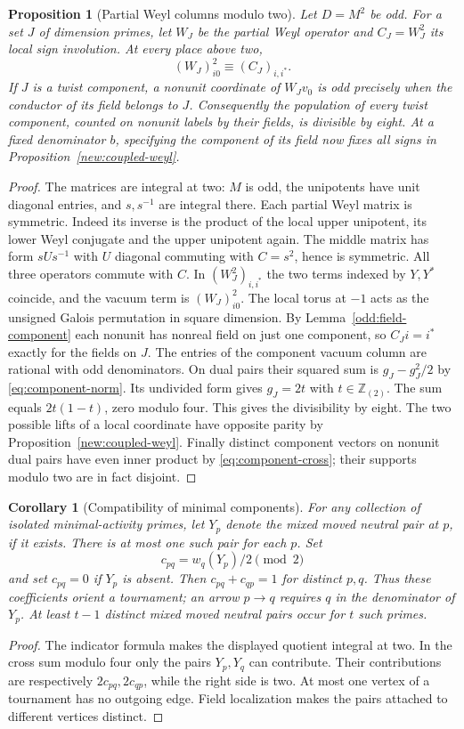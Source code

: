 \documentclass[11pt]{amsart}
\numberwithin{equation}{section}
\newtheorem{proposition}[theorem]{Proposition}
\newtheorem{corollary}[theorem]{Corollary}
\theoremstyle{definition}
\theoremstyle{plain}
\newcommand{\ZZ}{\mathbb Z}
\begin{document}
\begin{proposition}[Partial Weyl columns modulo two]\label{new:weyl-parity}
Let $D=M^2$ be odd. For a set $J$ of dimension primes, let $W_J$
be the partial Weyl operator and $C_J=W_J^2$ its local sign involution.
At every place above two,
\[
              (W_J)_{i0}^2\equiv (C_J)_{i,i^*}.
\]
If $J$ is a twist component, a nonunit coordinate of $W_Jv_0$ is
odd precisely when the conductor of its field belongs to $J$.
Consequently the population of every twist component, counted on
nonunit labels by their fields, is divisible by eight. At a fixed
denominator $b$, specifying the component of its field now fixes
all signs in Proposition~\ref{new:coupled-weyl}.
\end{proposition}
\begin{proof}
The matrices are integral at two: $M$ is odd, the unipotents have
unit diagonal entries, and $s,s^{-1}$ are integral there. Each partial
Weyl matrix is symmetric. Indeed its inverse is the product of the
local upper unipotent, its lower Weyl conjugate and the upper
unipotent again. The middle matrix has form $sUs^{-1}$ with $U$
diagonal commuting with $C=s^2$, hence is symmetric.
All three operators commute with $C$.
In $(W_J^2)_{i,i^*}$ the two terms indexed by $Y,Y^*$ coincide,
and the vacuum term is $(W_J)_{i0}^2$. The local torus at $-1$
acts as the unsigned Galois permutation in square dimension.
By Lemma~\ref{odd:field-component} each nonunit has nonreal field
on just one component, so $C_Ji=i^*$ exactly for the fields on $J$.
The entries of the component vacuum column are rational with odd
denominators. On dual pairs their squared sum is $g_J-g_J^2/2$
by \eqref{eq:component-norm}. Its undivided form gives $g_J=2t$
with $t\in\ZZ_{(2)}$. The sum equals $2t(1-t)$, zero modulo four.
This gives the divisibility by eight. The two possible lifts of a
local coordinate have opposite parity by Proposition~\ref{new:coupled-weyl}.
Finally distinct component vectors on nonunit dual pairs have even
inner product by \eqref{eq:component-cross}; their supports modulo two
are in fact disjoint.
\end{proof}

\begin{corollary}[Compatibility of minimal components]
\label{new:minimal-component-tournament}
For any collection of isolated minimal-activity primes, let $Y_p$
denote the mixed moved neutral pair at $p$, if it exists.  There is
at most one such pair for each $p$.  Set
\[
 c_{pq}=w_q(Y_p)/2\pmod2
\]
and set $c_{pq}=0$ if $Y_p$ is absent.  Then
$c_{pq}+c_{qp}=1$ for distinct $p,q$.
Thus these coefficients orient a tournament; an arrow $p\to q$
requires $q$ in the denominator of $Y_p$.  At least $t-1$ distinct
mixed moved neutral pairs occur for $t$ such primes.
\end{corollary}
\begin{proof}
The indicator formula makes the displayed quotient integral at two.
In the cross sum modulo four only the pairs $Y_p,Y_q$ can contribute.
Their contributions are respectively $2c_{pq},2c_{qp}$, while the
right side is two.  At most one vertex of a tournament has no outgoing
edge.  Field localization makes the pairs attached to different
vertices distinct.
\end{proof}
\end{document}

